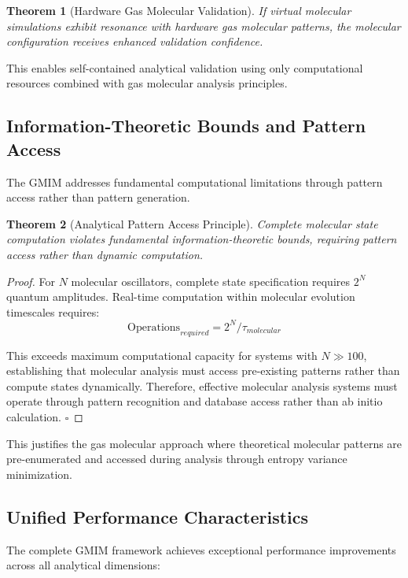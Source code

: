 \documentclass[11pt,a4paper]{article}
\newtheorem{theorem}{Theorem}[section]
\theoremstyle{remark}
\begin{document}
\begin{theorem}[Hardware Gas Molecular Validation]
If virtual molecular simulations exhibit resonance with hardware gas molecular patterns, the molecular configuration receives enhanced validation confidence.
\end{theorem}

This enables self-contained analytical validation using only computational resources combined with gas molecular analysis principles.

\subsection{Information-Theoretic Bounds and Pattern Access}

The GMIM addresses fundamental computational limitations through pattern access rather than pattern generation.

\begin{theorem}[Analytical Pattern Access Principle]
Complete molecular state computation violates fundamental information-theoretic bounds, requiring pattern access rather than dynamic computation.
\end{theorem}

\begin{proof}
For $N$ molecular oscillators, complete state specification requires $2^N$ quantum amplitudes. Real-time computation within molecular evolution timescales requires:
$$\text{Operations}_{required} = 2^N / \tau_{molecular}$$

This exceeds maximum computational capacity for systems with $N \gg 100$, establishing that molecular analysis must access pre-existing patterns rather than compute states dynamically. Therefore, effective molecular analysis systems must operate through pattern recognition and database access rather than ab initio calculation. $\square$
\end{proof}

This justifies the gas molecular approach where theoretical molecular patterns are pre-enumerated and accessed during analysis through entropy variance minimization.

\subsection{Unified Performance Characteristics}

The complete GMIM framework achieves exceptional performance improvements across all analytical dimensions:
\end{document}
